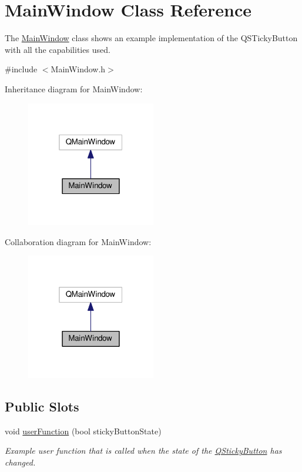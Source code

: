 \hypertarget{class_main_window}{\section{Main\-Window Class Reference}
\label{class_main_window}
}


The \hyperlink{class_main_window}{Main\-Window} class shows an example implementation of the Q\-S\-Ticky\-Button with all the capabilities used.  




{\ttfamily \#include $<$Main\-Window.\-h$>$}



Inheritance diagram for Main\-Window\-:
\nopagebreak
\begin{figure}[H]
\begin{center}
\leavevmode
\includegraphics[width=160pt]{class_main_window__inherit__graph}
\end{center}
\end{figure}


Collaboration diagram for Main\-Window\-:
\nopagebreak
\begin{figure}[H]
\begin{center}
\leavevmode
\includegraphics[width=160pt]{class_main_window__coll__graph}
\end{center}
\end{figure}
\subsection*{Public Slots}
\begin{DoxyCompactItemize}
\item 
void \hyperlink{class_main_window_a648ea2bfab3eef2287c28a76a8e86948}{user\-Function} (bool sticky\-Button\-State)
\begin{DoxyCompactList}\small\item\em Example user function that is called when the state of the \hyperlink{class_q_sticky_button}{Q\-Sticky\-Button} has changed. \end{DoxyCompactList}\end{DoxyCompactItemize}
